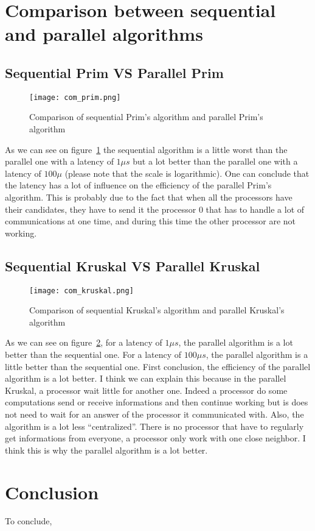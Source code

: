\documentclass[
10pt, %
a4paper, %
oneside, %
headinclude,footinclude, %
BCOR5mm, %
]{scrartcl}
\begin{document}
\section{Comparison between sequential and parallel algorithms}

\subsection{Sequential Prim VS Parallel Prim}
\begin{figure}
  \centering
  \texttt{[image: com\_prim.png]}
  \caption{Comparison of sequential Prim's algorithm and parallel
    Prim's algorithm}
  \label{fig:comp_prim}
\end{figure}

As we can see on figure~\ref{fig:comp_prim} the sequential algorithm
is a little worst than the parallel one with a latency of $1\mu s$ but
a lot better than the parallel one with a latency of $100 \mu$ (please
note that the scale is logarithmic). One can conclude that the latency
has a lot of influence on the efficiency of the parallel Prim's
algorithm. This is probably due to the fact that when all the
processors have their candidates, they have to send it the processor 0
that has to handle a lot of communications at one time, and during
this time the other processor are not working.

\subsection{Sequential Kruskal VS Parallel Kruskal}

\begin{figure}
  \centering
  \texttt{[image: com\_kruskal.png]}
  \caption{Comparison of sequential Kruskal's algorithm and parallel
    Kruskal's algorithm}
  \label{fig:comp_kruskal}
\end{figure}

As we can see on figure~\ref{fig:comp_kruskal}, for a latency of $1\mu
s$, the parallel algorithm is a lot better than the sequential
one. For a latency of $100 \mu s$, the parallel algorithm is a little
better than the sequential one. First conclusion, the efficiency of
the parallel algorithm is a lot better. I think we can explain this
because in the parallel Kruskal, a processor wait little for another
one. Indeed a processor do some computations send or receive
informations and then continue working but is does not need to wait
for an answer of the processor it communicated with. Also, the
algorithm is a lot less ``centralized''. There is no processor that
have to regularly get informations from everyone, a processor only
work with one close neighbor. I think this is why the parallel
algorithm is a lot better.

\section{Conclusion}

To conclude, 
\end{document}
